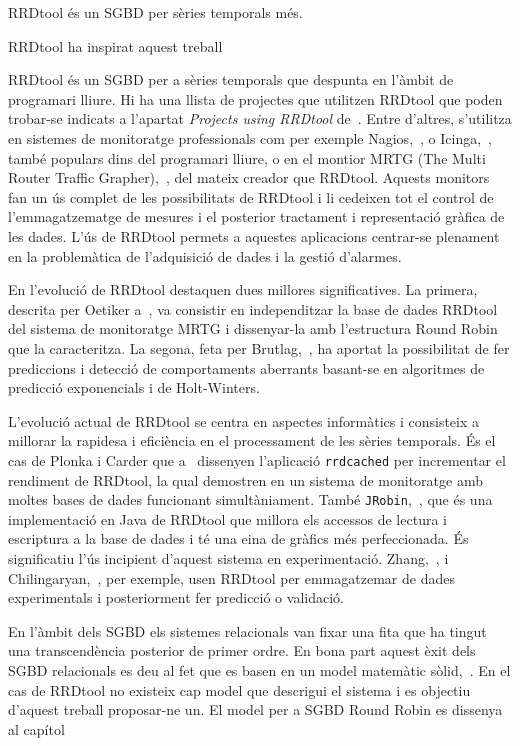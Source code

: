 RRDtool és un SGBD per sèries temporals més. 

RRDtool ha inspirat aquest treball


RRDtool és un SGBD per a sèries temporals que despunta en l'àmbit de programari lliure. Hi ha una llista de projectes que utilitzen RRDtool que poden trobar-se indicats a l'apartat \emph{Projects using RRDtool} de~\cite{rrdtool}.
Entre d'altres, s'utilitza en sistemes de monitoratge professionals com per exemple Nagios,~\cite{nagios}, o Icinga,~\cite{icinga}, també populars dins del programari lliure, o en el montior MRTG (The Multi Router Traffic Grapher),~\cite{mrtg}, del mateix creador que RRDtool. Aquests monitors fan un ús complet de les possibilitats de RRDtool i li cedeixen tot el control de l'emmagatzematge de mesures i el posterior tractament i representació gràfica de les dades. 
L'ús de RRDtool permets a aquestes aplicacions centrar-se plenament en la problemàtica de l'adquisició de dades i la gestió d'alarmes.

En l'evolució de RRDtool destaquen dues millores significatives.
La primera, descrita per Oetiker a~\cite{lisa98:oetiker}, va consistir en independitzar la base de dades RRDtool del sistema de monitoratge MRTG i dissenyar-la amb l'estructura Round Robin que la caracteritza. La segona, feta per Brutlag,~\cite{lisa00:brutlag}, ha aportat la possibilitat de fer prediccions i detecció de comportaments aberrants basant-se en algoritmes de predicció exponencials i de Holt-Winters. 


L'evolució actual de RRDtool se centra en aspectes informàtics i consisteix a millorar la rapidesa i eficiència en el processament de les sèries temporals. És el cas de Plonka i Carder que a~\cite{carder:rrdcached,lisa07:plonka} dissenyen l'aplicació \verb+rrdcached+ per incrementar el rendiment de RRDtool, la qual demostren en un sistema de monitoratge amb moltes bases de dades funcionant simultàniament.  També \verb+JRobin+,~\cite{jrobin}, que és una implementació en Java de RRDtool que millora els accessos de lectura i escriptura a la base de dades i té una eina de gràfics més perfeccionada.
És significatiu l'ús incipient d'aquest sistema en experimentació. Zhang,~\cite{zhang07}, i Chilingaryan,~\cite{chilingaryan10}, per exemple, usen RRDtool per emmagatzemar de dades experimentals i posteriorment fer predicció o validació.
  

En l'àmbit dels SGBD els sistemes relacionals van fixar una fita que ha tingut una transcendència posterior de  primer ordre. En bona part aquest èxit dels SGBD relacionals es deu al fet que es basen en un model matemàtic sòlid,~\cite{date}.
En el cas de RRDtool no existeix  cap model que descrigui el sistema i es objectiu d'aquest treball proposar-ne un. El model per a SGBD Round Robin es dissenya  al capítol







